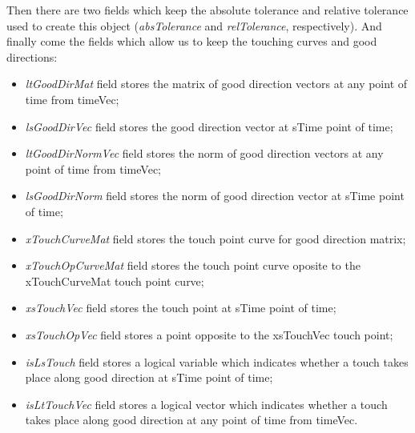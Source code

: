 \documentclass[letterpaper,10pt,english]{sphinxmanual}
\begin{document}
Then there are two fields which keep the absolute tolerance and relative tolerance used to create this object (\emph{absTolerance} and \emph{relTolerance}, respectively). And finally come the fields which allow us to keep the touching curves and good directions:
\begin{itemize}
\item {} 
\emph{ltGoodDirMat} field stores the matrix of good direction vectors at any point of time from        timeVec;

\item {} 
\emph{lsGoodDirVec} field stores the good direction vector at sTime point of time;

\item {} 
\emph{ltGoodDirNormVec} field stores the norm of good direction vectors at any point of time from      timeVec;

\item {} 
\emph{lsGoodDirNorm} field stores the norm of good direction vector at sTime point of time;

\item {} 
\emph{xTouchCurveMat} field stores the touch point curve for good direction matrix;

\item {} 
\emph{xTouchOpCurveMat} field stores the touch point curve oposite to the xTouchCurveMat touch         point curve;

\item {} 
\emph{xsTouchVec} field stores the touch point at sTime point of time;

\item {} 
\emph{xsTouchOpVec} field stores a point opposite to the xsTouchVec touch point;

\item {} 
\emph{isLsTouch} field stores a logical variable which indicates whether a touch takes place along     good direction at sTime point of time;

\item {} 
\emph{isLtTouchVec} field stores a logical vector which indicates whether a touch takes place          along good direction at any point of time from timeVec.

\end{itemize}
\end{document}
